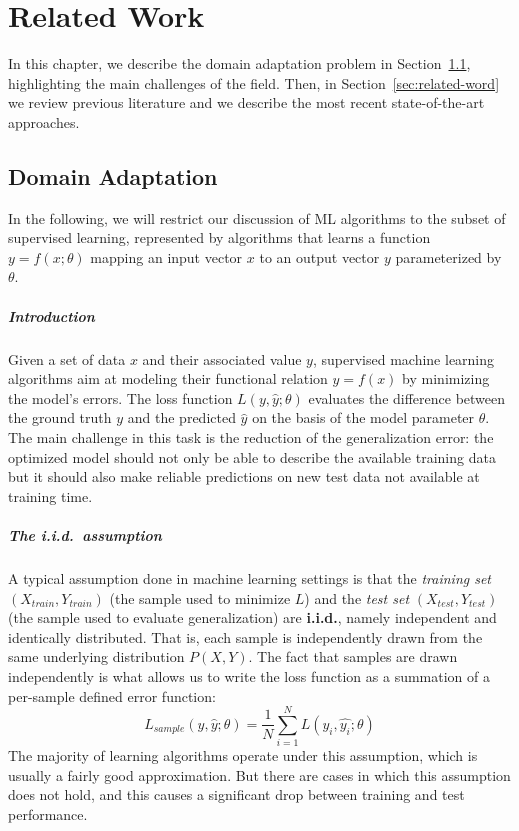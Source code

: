 \documentclass[../main.tex]{subfiles}
\begin{document}
    \chapter{Related Work}\label{chap:related}

    In this chapter, we describe the domain adaptation problem in Section~\ref{sec:domainadapt}, highlighting the main challenges of the field.
    Then, in Section~\ref{sec:related-word} we review previous literature and we describe the most recent state-of-the-art approaches.
 
    \section{Domain Adaptation}\label{sec:domainadapt}

    In the following, we will restrict our discussion of ML algorithms to the subset of supervised learning, represented by algorithms that learns
    a function $y = f(x; \theta)$ mapping an input vector $x$ to an output vector $y$ parameterized by $\theta$.

    \paragraph{Introduction}
    Given a set of data $x$ and their associated value $y$, supervised machine learning algorithms aim at modeling their functional relation $y = f(x)$
    by minimizing the model's errors. The loss function $L(y, \hat{y}; \theta)$ evaluates the difference between the ground truth $y$ and the predicted $\hat{y}$
    on the basis of the model parameter $\theta$. The main challenge in this task is the reduction of the generalization error: the optimized model should not only
    be able to describe the available training data but it should also make reliable predictions on new test data not available at training time.

    \paragraph{The i.i.d.\ assumption}
    A typical assumption done in machine learning settings is that the \textit{training set}
    $( X_{train}, Y_{train} )$ (the sample used to minimize $L$) and the \textit{test set} $( X_{test}, Y_{test} )$
    (the sample used to evaluate generalization) are \textbf{i.i.d.}, namely independent and identically distributed. That is, each sample
    is independently drawn from the same underlying distribution $P(X, Y)$. The fact that samples are drawn independently is what allows us to write the loss function
    as a summation of a per-sample defined error function:
    $$ L_{sample}(y, \hat{y}; \theta) = \frac{1}{N} \sum_{i = 1}^{N} L(y_{i}, \hat{y_{i}}; \theta) $$
    The majority of learning algorithms operate under this assumption, which is usually a fairly good
    approximation. But there are cases in which this assumption does not hold, and this causes a significant drop between
    training and test performance.
\end{document}
